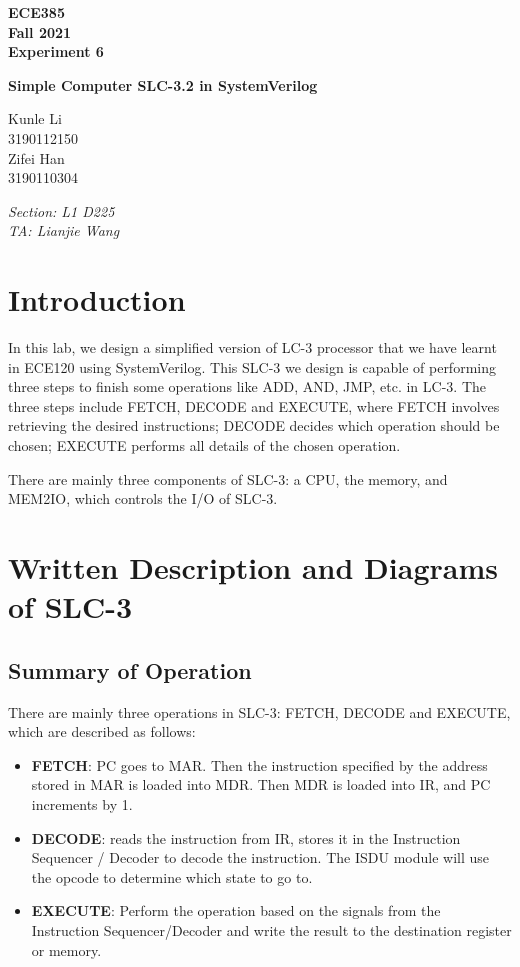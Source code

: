 \documentclass[11pt]{article}
\begin{document}
\begin{titlepage}
    \centering
    {\Huge\bfseries ECE385\\\Large Fall 2021\\\Large Experiment 6}

    \vspace{1cm}
    
    {\LARGE\bfseries Simple Computer SLC-3.2 in SystemVerilog}
    
    \vspace{2cm}
    
    {\Large Kunle Li\\3190112150\\Zifei Han\\3190110304}
     
    \vfill
    
    {\large\itshape Section: L1 D225\\TA: Lianjie Wang}
    \end{titlepage}

\tableofcontents
\section{Introduction}
In this lab, we design a simplified version of LC-3 processor that we have learnt in ECE120 using SystemVerilog. This SLC-3 we design is capable of performing three steps to finish some operations like ADD, AND, JMP, etc. in LC-3. The three steps include FETCH, DECODE and EXECUTE, where FETCH involves retrieving the desired instructions; DECODE decides which operation should be chosen; EXECUTE performs all details of the chosen operation.

There are mainly three components of SLC-3: a CPU, the memory, and MEM2IO, which controls the I/O of SLC-3.

\section{Written Description and Diagrams of SLC-3}
\subsection{Summary of Operation}
There are mainly three operations in SLC-3: FETCH, DECODE and EXECUTE, which are described as follows:

\begin{itemize}
    \item \textbf{FETCH}: PC goes to MAR. Then the instruction specified by the address stored in MAR is loaded into MDR. Then MDR is loaded into IR, and PC increments by 1.
    \item \textbf{DECODE}: reads the instruction from IR, stores it in the Instruction Sequencer / Decoder to decode the instruction. The ISDU module will use the opcode to determine which state to go to.
    \item \textbf{EXECUTE}: Perform the operation based on the signals from the Instruction Sequencer/Decoder and write the result to the destination register or memory.
\end{itemize}
\end{document}
